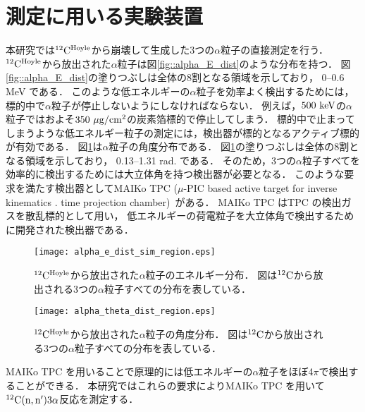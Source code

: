 \documentclass[../master]{subfiles}
\begin{document}
\section{測定に用いる実験装置}
\label{seq::detector_using_experiment}
本研究では${}^{12}{\rm C}^{\rm Hoyle}$から崩壊して生成した3つの$\alpha$粒子の直接測定を行う．
${}^{12}{\rm C}^{\rm Hoyle}$から放出された$\alpha$粒子は図\ref{fig::alpha_E_dist}のような分布を持つ．
図\ref{fig::alpha_E_dist}の塗りつぶしは全体の8割となる領域を示しており，
0--0.6 MeV である．
このような低エネルギーの$\alpha$粒子を効率よく検出するためには，
標的中で$\alpha$粒子が停止しないようにしなければならない．
例えば，$500~{\rm keV}$の$\alpha$粒子ではおよそ$350~{\rm \mu g/cm^2}$の炭素箔標的で停止してしまう．
標的中で止まってしまうような低エネルギー粒子の測定には，検出器が標的となるアクティブ標的が有効である．
図\ref{fig::alpha_theta_dist}は$\alpha$粒子の角度分布である．
図\ref{fig::alpha_theta_dist}の塗りつぶしは全体の8割となる領域を示しており，
0.13--1.31 rad. である．
そのため，3つの$\alpha$粒子すべてを効率的に検出するためには大立体角を持つ検出器が必要となる．
このような要求を満たす検出器としてMAIKo TPC ($\mu$-PIC based active target for inverse kinematics .
time projection chamber)~\cite{maiko, mupic}がある．
MAIKo TPC はTPC の検出ガスを散乱標的として用い，
低エネルギーの荷電粒子を大立体角で検出するために開発された検出器である．
\begin{figure}
  \centering
  \texttt{[image: alpha\_e\_dist\_sim\_region.eps]}
  \caption[${}^{12}{\rm C}^{\rm Hoyle}$から放出された$\alpha$粒子のエネルギー分布．]
          {${}^{12}{\rm C}^{\rm Hoyle}$から放出された$\alpha$粒子のエネルギー分布．
            図は${}^{12}{\rm C}$から放出される3つの$\alpha$粒子すべての分布を表している．}
  \label{fig::alpha_E_dist}
  \texttt{[image: alpha\_theta\_dist\_region.eps]}
  \caption[${}^{12}{\rm C}^{\rm Hoyle}$から放出された$\alpha$粒子の角度分布．]
          {${}^{12}{\rm C}^{\rm Hoyle}$から放出された$\alpha$粒子の角度分布．
            図は${}^{12}{\rm C}$から放出される3つの$\alpha$粒子すべての分布を表している．
          }
  \label{fig::alpha_theta_dist}
\end{figure}
MAIKo TPC を用いることで原理的には低エネルギーの$\alpha$粒子をほぼ4$\pi$で検出することができる．
本研究ではこれらの要求によりMAIKo TPC を用いて${}^{12}{\rm C}({\rm n},{\rm n}')3\alpha$反応を測定する．
\end{document}
